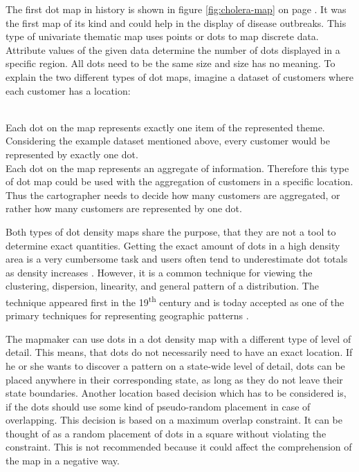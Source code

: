 The first dot map in history is shown in figure \ref{fig:cholera-map} on page \pageref{fig:cholera-map}. It was the first map of its kind and could help in the display of disease outbreaks. This type of univariate thematic map uses points or dots to map discrete data. Attribute values of the given data determine the number of dots displayed in a specific region. All dots need to be the same size and size has no meaning. To explain the two different types of dot maps, imagine a dataset of customers where each customer has a location:

\begin{enumerate}
 \hfill \\
Each dot on the map represents exactly one item of the represented theme. Considering the example dataset mentioned above, every customer would be represented by exactly one dot.
 \hfill \\
Each dot on the map represents an aggregate of information. Therefore this type of dot map could be used with the aggregation of customers in a specific location. Thus the cartographer needs to decide how many customers are aggregated, or rather how many customers are represented by one dot.
\end{enumerate}

Both types of dot density maps share the purpose, that they are not a tool to determine exact quantities. Getting the exact amount of dots in a high density area is a very cumbersome task and users often tend to underestimate dot totals as density increases . However, it is a common technique for viewing the clustering, dispersion, linearity, and general pattern of a distribution. The technique appeared first in the 19\textsuperscript{th} century and is today accepted as one of the primary techniques for representing geographic patterns .

The mapmaker can use dots in a dot density map with a different type of level of detail. This means, that dots do not necessarily need to have an exact location. If he or she wants to discover a pattern on a state-wide level of detail, dots can be placed anywhere in their corresponding state, as long as they do not leave their state boundaries.
Another location based decision which has to be considered is, if the dots should use some kind of pseudo-random placement in case of overlapping. This decision is based on a maximum overlap constraint. It can be thought of as a random placement of dots in a square without violating the constraint. This is not recommended because it could affect the comprehension of the map in a negative way.

